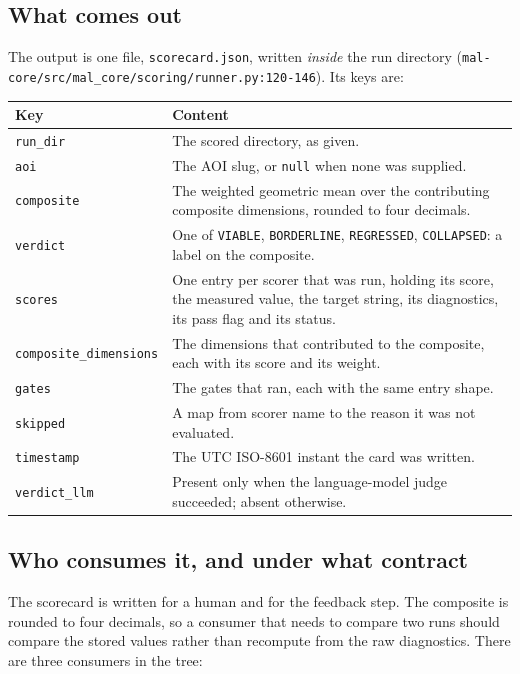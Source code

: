 \documentclass[11pt,a4paper]{article}
\newcommand{\code}[1]{\texttt{#1}}
\begin{document}
\subsection{What comes out}

The output is one file, \code{scorecard.json}, written \emph{inside} the run
directory (\code{mal-core/src/mal\_core/scoring/runner.py:120-146}). Its keys
are:

\begin{longtable}{@{}p{3.6cm}p{11.4cm}@{}}
\toprule
Key & Content \\
\midrule
\endhead
\code{run\_dir} & The scored directory, as given. \\
\code{aoi} & The AOI slug, or \code{null} when none was supplied. \\
\code{composite} & The weighted geometric mean over the contributing composite
dimensions, rounded to four decimals. \\
\code{verdict} & One of \code{VIABLE}, \code{BORDERLINE},
\code{REGRESSED}, \code{COLLAPSED}: a label on the composite. \\
\code{scores} & One entry per scorer that was run, holding its score, the
measured value, the target string, its diagnostics, its pass flag and its
status. \\
\code{composite\_dimensions} & The dimensions that contributed to the
composite, each with its score and its weight. \\
\code{gates} & The gates that ran, each with the same entry shape. \\
\code{skipped} & A map from scorer name to the reason it was not evaluated. \\
\code{timestamp} & The UTC ISO-8601 instant the card was written. \\
\code{verdict\_llm} & Present only when the language-model judge succeeded;
absent otherwise. \\
\bottomrule
\end{longtable}

\subsection{Who consumes it, and under what contract}

The scorecard is written for a human and for the feedback step. The
composite is rounded to four decimals, so a consumer that needs to compare
two runs should compare the stored values rather than recompute from the
raw diagnostics. There are three consumers in the tree:
\end{document}

